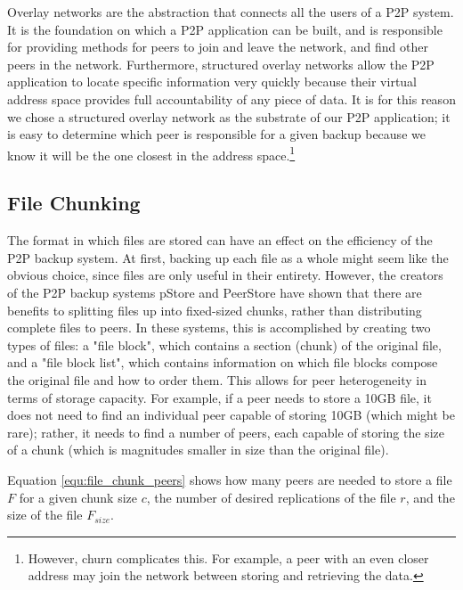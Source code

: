 \documentclass[12pt]{report}
\begin{document}
Overlay networks are the abstraction that connects all the users of a P2P system. It is the foundation on which a P2P application can be built, and is responsible for providing methods for peers to join and leave the network, and find other peers in the network. Furthermore, structured overlay networks allow the P2P application to locate specific information very quickly because their virtual address space provides full accountability of any piece of data. It is for this reason we chose a structured overlay network as the substrate of our P2P application; it is easy to determine which peer is responsible for a given backup because we know it will be the one closest in the address space.\footnote{However, churn complicates this. For example, a peer with an even closer address may join the network between storing and retrieving the data.}


\subsection{File Chunking} \label{sec:filechunking}
The format in which files are stored can have an effect on the efficiency of the P2P backup system. At first, backing up each file as a whole might seem like the obvious choice, since files are only useful in their entirety. However, the creators of the P2P backup systems pStore \cite{pStore} and PeerStore \cite{PeerStore} have shown that there are benefits to splitting files up into fixed-sized chunks, rather than distributing complete files to peers. In these systems, this is accomplished by creating two types of files: a "file block", which contains a section (chunk) of the original file, and a "file block list", which contains information on which file blocks compose the original file and how to order them. This allows for peer heterogeneity in terms of storage capacity. For example, if a peer needs to store a 10GB file, it does not need to find an individual peer capable of storing 10GB (which might be rare); rather, it needs to find a number of peers, each capable of storing the size of a chunk (which is magnitudes smaller in size than the original file).

Equation \ref{equ:file_chunk_peers} shows how many peers are needed to store a file $F$ for a given chunk size $c$, the number of desired replications of the file $r$, and the size of the file $F_{size}$.
\end{document}
